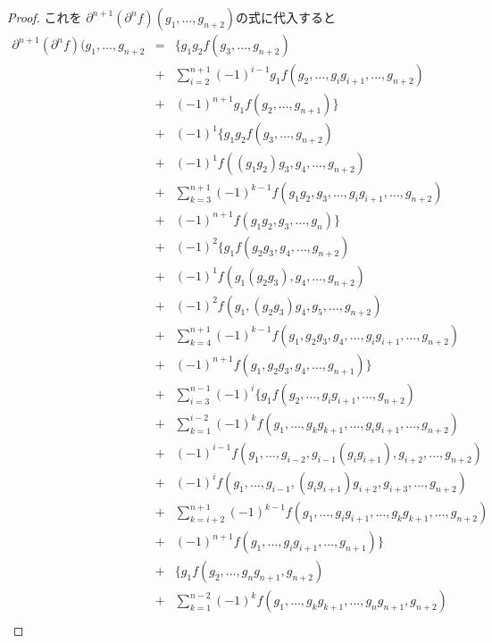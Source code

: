 \documentclass[../master_galois_theory]{subfiles}
\begin{document}
\begin{proof}
これを $\partial^{n+1}(\partial^n f)(g_1 , \dots , g_{n+2})$の式に代入すると
\begin{eqnarray*}
  \partial^{n+1}(\partial^n f)(g_1 , \dots , g_{n+2}
  & = & \{ g_1 g_2 f(g_3 , \dots , g_{n+2}) \\
  & + & \sum_{i=2}^{n+1} (-1)^{i-1} g_1 f(g_2 , \dots , g_i g_{i+1} , \dots , g_{n+2}) \\
  & + & (-1)^{n+1} g_1 f(g_2 , \dots , g_{n+1}) \} \\
  & + & (-1)^1 \{ g_1 g_2 f(g_3 , \dots , g_{n+2}) \\
  & + & (-1)^1 f((g_1 g_2) g_3 , g_4 , \dots , g_{n+2}) \\
  & + & \sum_{k=3}^{n+1} (-1)^{k-1} f(g_1 g_2 , g_3 , \dots , g_i g_{i+1} , \dots , g_{n+2}) \\
  & + & (-1)^{n+1} f(g_1 g_2 , g_3 , \dots , g_n) \} \\
  & + & (-1)^2 \{ g_1 f(g_2 g_3 , g_4 , \dots , g_{n+2}) \\
  & + & (-1)^1 f(g_1 (g_2 g_3) , g_4 , \dots , g_{n+2}) \\
  & + & (-1)^2 f(g_1 , (g_2 g_3) g_4 , g_5 , \dots , g_{n+2}) \\
  & + & \sum_{k=4}^{n+1} (-1)^{k-1} f(g_1 , g_2 g_3 , g_4 , \dots , g_i g_{i+1} , \dots , g_{n+2}) \\
  & + & (-1)^{n+1} f(g_1 , g_2 g_3 , g_4 , \dots , g_{n+1}) \} \\
  & + & \sum_{i=3}^{n-1} (-1)^i \{ g_1 f(g_2 , \dots , g_i g_{i+1} , \dots , g_{n+2}) \\
  & + & \sum_{k=1}^{i-2} (-1)^k f(g_1 , \dots , g_k g_{k+1} , \dots , g_i g_{i+1} , \dots , g_{n+2}) \\
  & + & (-1)^{i-1} f(g_1 , \dots , g_{i-2} , g_{i-1} (g_i g_{i+1}) , g_{i+2} , \dots , g_{n+2}) \\
  & + & (-1)^i f(g_1 , \dots , g_{i-1} , (g_i g_{i+1}) g_{i+2} , g_{i+3} , \dots , g_{n+2}) \\
  & + & \sum_{k=i+2}^{n+1} (-1)^{k-1} f(g_1 , \dots , g_i g_{i+1} , \dots , g_k g_{k+1} , \dots , g_{n+2}) \\
  & + & (-1)^{n+1} f(g_1 , \dots , g_i g_{i+1} , \dots , g_{n+1}) \} \\
  & + & \{ g_1 f(g_2 , \dots , g_n g_{n+1} , g_{n+2}) \\
  & + & \sum_{k=1}^{n-2} (-1)^k f(g_1 , \dots , g_k g_{k+1} , \dots , g_n g_{n+1} , g_{n+2}) \\

\end{eqnarray*}
\end{proof}
\end{document}

